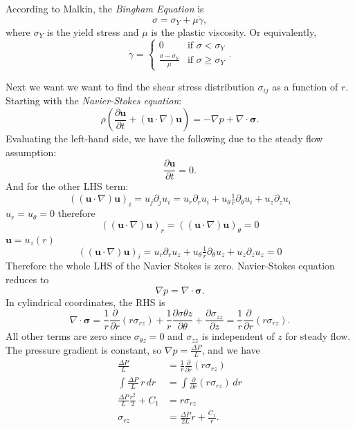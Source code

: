 According to Malkin, the \textit{Bingham Equation} is
\begin{equation}
	\sigma = \sigma_Y + \mu \dot\gamma,
	\label{eq:bingham}
\end{equation}
where $\sigma_Y$ is the yield stress and $\mu$ is the plastic viscosity.
Or equivalently,
\[
	\dot\gamma = \begin{cases}
		0 & \text{if } \sigma < \sigma_Y \\
		\frac{\sigma - \sigma_Y}{\mu} & \text{if } \sigma \geq \sigma_Y
	\end{cases}.
\]

Next we want we want to find the shear stress distribution $\sigma_{ij}$ as a function of $r$.
Starting with the \emph{Navier-Stokes equation}:
\[
	\rho \left( \frac{\partial \mathbf{u}}{\partial t} + (\mathbf{u}\cdot\nabla)\mathbf{u} \right) = -\nabla p + \nabla\cdot\boldsymbol{\sigma}.
\]
Evaluating the left-hand side, we have the following due to the steady flow assumption:
\[
	\frac{\partial \mathbf{u}}{\partial t} = 0.
\]
And for the other LHS term:
\[
	((\mathbf{u}\cdot\nabla)\mathbf{u})_i
	= u_j \partial_j u_i
	= u_r \partial_r u_i + u_\theta \tfrac1r\partial_\theta u_i + u_z \partial_z u_i
\]
$u_r = u_\theta = 0$ therefore
\[
	((\mathbf{u}\cdot\nabla)\mathbf{u})_r = 
	((\mathbf{u}\cdot\nabla)\mathbf{u})_\theta = 0
\]
$\mathbf{u} = u_z(r)$
\[
	((\mathbf{u}\cdot\nabla)\mathbf{u})_i
	= u_r \partial_r u_z + u_\theta \tfrac1r\partial_\theta u_z + u_z \partial_z u_z = 0
\]
Therefore the whole LHS of the Navier Stokes is zero. Navier-Stokes equation reduces to
\[
	\nabla p = \nabla\cdot\boldsymbol{\sigma}.
\]
In cylindrical coordinates, the RHS is 
\[
	\nabla\cdot\boldsymbol{\sigma} = 
	\frac{1}{r}\frac{\partial}{\partial r}(r\sigma_{rz}) + 
	\frac{1}{r}\frac{\partial \sigma{\theta z}}{\partial \theta} + 
	\frac{\partial \sigma_{zz}}{\partial z}
	= \frac{1}{r}\frac{\partial}{\partial r}(r\sigma_{rz}).
\]
All other terms are zero since $\sigma_{\theta z} = 0$ and $\sigma_{zz}$ is independent of $z$ for steady flow. The pressure gradient is constant, so $\nabla p = \frac{\Delta P}{L}$, and we have
\begin{align*}
	\frac{\Delta P}{L} &= \frac{1}{r}\frac{\partial}{\partial r}(r\sigma_{rz})\\
	\int \frac{\Delta P}{L}\, r\,dr
	&= \int \frac{\partial}{\partial r}(r\sigma_{rz})\,dr\\
	\frac{\Delta P}{L}\frac{r^2}{2} + C_1
	&= r\sigma_{rz}\\
	\sigma_{rz}
	&=
	\frac{\Delta P}{2L} r + \frac{C_1}{r}.
\end{align*}

